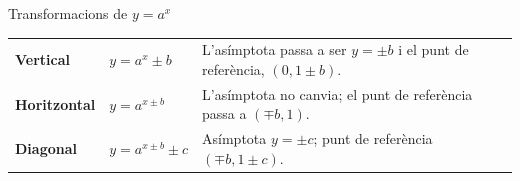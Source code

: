 \documentclass[11pt,a4paper]{article}
\begin{document}
\begin{fmprop}{Transformacions de $y=a^x$}
\begin{center}\renewcommand{\arraystretch}{1.5}\small\begin{tabularx}{\linewidth}{>{\raggedright\arraybackslash}p{3.2cm}>{\raggedright\arraybackslash}X>{\raggedright\arraybackslash}X}\toprule
\textbf{Vertical} & $y=a^x\pm b$ & L'asímptota passa a ser $y=\pm b$ i el punt de referència, $(0,1\pm b)$.\\[3pt]
\textbf{Horitzontal} & $y=a^{x\pm b}$ & L'asímptota no canvia; el punt de referència passa a $(\mp b,1)$.\\[3pt]
\textbf{Diagonal} & $y=a^{x\pm b}\pm c$ & Asímptota $y=\pm c$; punt de referència $(\mp b,1\pm c)$.\\[3pt]
\bottomrule\end{tabularx}\end{center}


\end{fmprop}
\end{document}
